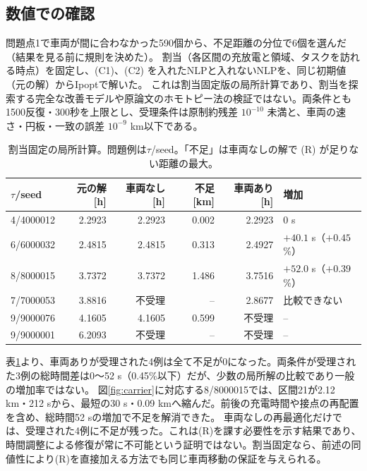 \documentclass[uplatex,dvipdfmx,a4paper,11pt,jafont=haranoaji]{bxjsarticle}
\newcommand{\answerpart}[1]{\par\Needspace{6\baselineskip}\subsection*{#1}}
\begin{document}
\answerpart{数値での確認}
問題点1で車両が間に合わなかった590個から、不足距離の分位で6個を選んだ（結果を見る前に規則を決めた）。
割当（各区間の充放電と領域、タスクを訪れる時点）を固定し、(C1)、(C2) を入れたNLPと入れないNLPを、同じ初期値（元の解）からIpopt\cite{ipopt}で解いた。
これは割当固定版の局所計算であり、割当を探索する完全な改善モデルや原論文のホモトピー法の検証ではない。両条件とも1500反復・300秒を上限とし、受理条件は原制約残差 $10^{-10}$ 未満と、車両の速さ・円板・一致の誤差 $10^{-9}$ km以下である。
\begin{table}[H]
  \centering
  \caption{割当固定の局所計算。問題例は$\tau$/seed。「不足」は車両なしの解で (R) が足りない距離の最大。}
  \label{tab:nlp}
  \begin{tabular}{lrrrrl}
    \toprule
    $\tau$/seed & 元の解 [h] & 車両なし [h] & 不足 [km] & 車両あり [h] & 増加 \\
    \midrule
    4/4000012 & 2.2923 & 2.2923 & 0.002 & 2.2923 & 0 s \\
    6/6000032 & 2.4815 & 2.4815 & 0.313 & 2.4927 & $+40.1$ s（$+0.45$\%） \\
    8/8000015 & 3.7372 & 3.7372 & 1.486 & 3.7516 & $+52.0$ s（$+0.39$\%） \\
    7/7000053 & 3.8816 & 不受理 & -- & 2.8677 & 比較できない \\
    9/9000076 & 4.1605 & 4.1605 & 0.599 & 不受理 & -- \\
    9/9000001 & 6.2093 & 不受理 & -- & 不受理 & -- \\
    \bottomrule
  \end{tabular}
\end{table}
表\ref{tab:nlp}より、車両ありが受理された4例は全て不足が0になった。両条件が受理された3例の総時間差は0〜52 s（0.45\%以下）だが、少数の局所解の比較であり一般の増加率ではない。
図\ref{fig:carrier}に対応する8/8000015では、区間21が2.12 km・212 sから、最短の30 s・0.09 kmへ縮んだ。前後の充電時間や接点の再配置を含め、総時間52 sの増加で不足を解消できた。
車両なしの再最適化だけでは、受理された4例に不足が残った。これは(R)を課す必要性を示す結果であり、時間調整による修復が常に不可能という証明ではない。割当固定なら、前述の同値性により(R)を直接加える方法でも同じ車両移動の保証を与えられる。
\end{document}
